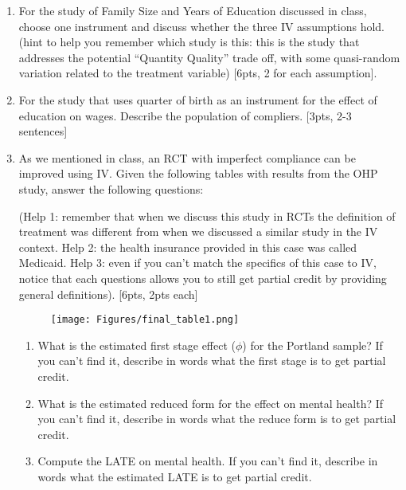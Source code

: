 \documentclass[answers]{exam}
\begin{document}
\begin{enumerate}
\vspace{3cm}

\newpage


\item For the study of Family Size and Years of Education discussed in class, choose one instrument and discuss whether the three IV assumptions hold. (hint to help you remember which study is this: this is the study that addresses the potential “Quantity Quality” trade off, with some quasi-random variation related to the treatment variable) [6pts, 2 for each assumption].
\vspace{5cm}



\item For the study that uses quarter of birth as an instrument for the effect of education on wages. Describe the population of compliers.  [3pts, 2-3 sentences]
\vspace{5cm}




\item As we mentioned in class, an RCT with imperfect compliance can be improved using IV. Given the following tables with results from the OHP study, answer the following questions:  

(Help 1: remember that when we discuss this study in RCTs the definition of treatment was different from when we discussed a similar study in the IV context. Help 2: the health insurance provided in this case was called Medicaid. Help 3: even if you can't match the specifics of this case to IV, notice that each questions allows you to still get partial credit by providing general definitions). [6pts, 2pts each]
 \begin{figure}[H]
    \centering
    \texttt{[image: Figures/final\_table1.png]}
    \label{}
\end{figure}
 \begin{enumerate}[label=\alph*)]
    \item What is the estimated first stage effect ($\phi$) for the Portland sample? If you can’t find it, describe in words what the first stage is to get partial credit. 
    \vspace{2cm}
    \item What is the estimated reduced form for the effect on mental health? If you can’t find it, describe in words what the reduce form is to get partial credit.
    \vspace{2cm}
    \item Compute the LATE on mental health. If you can’t find it, describe in words what the estimated LATE is to get partial credit. 
    \vspace{2cm}
   \end{enumerate}


\end{enumerate}
\end{document}
